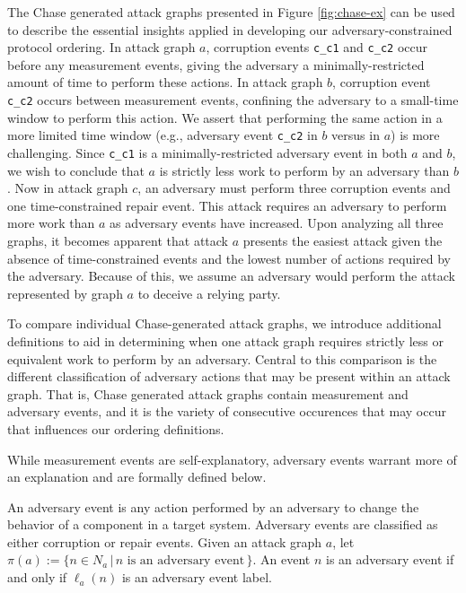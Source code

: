 \documentclass[runningheads]{llncs}
\theoremstyle{definition}
\begin{document}
The Chase generated attack graphs presented in Figure \ref{fig:chase-ex} can be used to describe the essential insights applied in developing our adversary-constrained protocol ordering. In attack graph $a$, corruption events \texttt{c\_c1} and \texttt{c\_c2} occur before any measurement events, giving the adversary a minimally-restricted amount of time to perform these actions. In attack graph $b$, corruption event \texttt{c\_c2} occurs between measurement events, confining the adversary to a small-time window to perform this action. We assert that performing the same action in a more limited time window (e.g., adversary event \texttt{c\_c2} in $b$ versus in $a$) is more challenging. Since \texttt{c\_c1} is a minimally-restricted adversary event in both $a$ and $b$, we wish to conclude that $a$ is strictly less work to perform by an adversary than $b$. Now in attack graph $c$, an adversary must perform three corruption events and one time-constrained repair event. This attack requires an adversary to perform more work than $a$ as adversary events have increased. Upon analyzing all three graphs, it becomes apparent that attack $a$ presents the easiest attack given the absence of time-constrained events and the lowest number of actions required by the adversary. Because of this, we assume an adversary would perform the attack represented by graph $a$ to deceive a relying party. 

To compare individual Chase-generated attack graphs, we introduce additional definitions to aid in determining when one attack graph requires strictly less or equivalent work to perform by an adversary. Central to this comparison is the different classification of adversary actions that may be present within an attack graph. That is, Chase generated attack graphs contain measurement and adversary events, and it is the variety of consecutive occurences that may occur that influences our ordering definitions. 

While measurement events are self-explanatory, adversary events warrant more of an explanation and are formally defined below.
 

\begin{definition}
    An adversary event is any action performed by an adversary to change the behavior of a component in a target system. Adversary events are classified as either corruption or repair events. Given an attack graph $a$, let $\pi(a) := \{n \in N_a \,|\, n \text{ is an adversary event}\,\}$. An event $n$ is an adversary event if and only if $\ell_a(n)$ is an adversary event label.
\end{definition}
\end{document}
